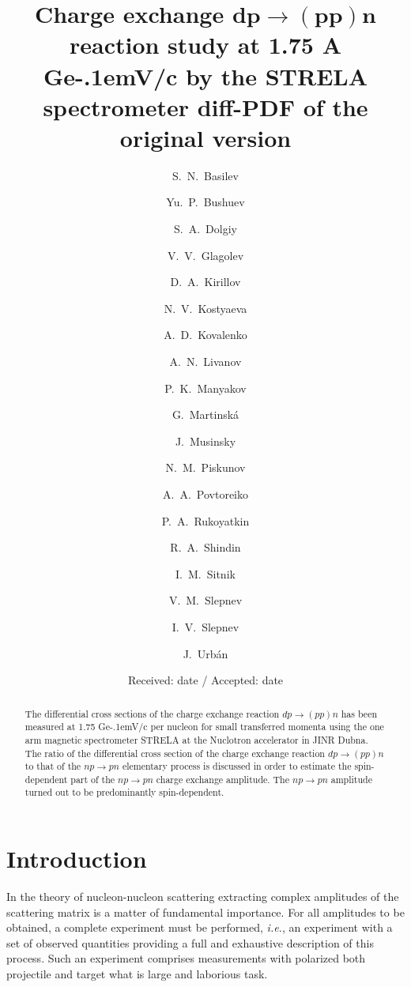 \documentclass[twocolumn,epjc3]{svjour3}
\newcommand{\np}     {\ensuremath{np \rightarrow pn}\xspace}
\newcommand{\dpchex} {\ensuremath{dp \rightarrow (pp)n}\xspace}
\newcommand{\GeVc}   {Ge\kern-.1emV/c\xspace}
\providecommand{\DIFaddtex}[1]{{\protect\color{Green} \sf #1}} %
\begin{document}
\title{Charge exchange
  $\boldsymbol{{\dpchex}}$ %
  reaction study at 1.75 A \GeVc by the STRELA spectrometer \DIFaddtex{diff-PDF of the original version}} %

\author{\raggedright
  S.~N.~Basilev    \and Yu.~P.~Bushuev   \and
  S.~A.~Dolgiy     \and V.~V.~Glagolev   \and
  D.~A.~Kirillov   \and N.~V.~Kostyaeva  \and
  A.~D.~Kovalenko  \and A.~N.~Livanov    \and
  P.~K.~Manyakov   \and G.~Martinsk\'{a} \and
  J.~Musinsky  \and N.~M.~Piskunov   \and
  A.~A.~Povtoreiko \and P.~A.~Rukoyatkin \and
  R.~A.~Shindin    \and I.~M.~Sitnik     \and
  V.~M.~Slepnev    \and I.~V.~Slepnev    \and
  J.~Urb\'{a}n
}


\date{Received: date / Accepted: date}
\maketitle

\begin{abstract}
  The differential cross sections of the charge exchange reaction \dpchex has
  been measured at 1.75 \GeVc per nucleon for small transferred momenta using
  the one arm magnetic spectrometer STRELA at the Nuclotron accelerator in JINR
  Dubna. The ratio of the differential cross section of the charge exchange
  reaction \dpchex to that of the \np elementary process is discussed in order
  to estimate the spin-dependent part of the \np charge exchange amplitude. The
  \np amplitude turned out to be predominantly spin-dependent.
\end{abstract}

\section{Introduction}
In the theory of nucleon-nucleon scattering extracting complex amplitudes of the
scattering matrix is a matter of fundamental importance. For all amplitudes to
be obtained, a complete experiment must be performed, \textit{i.e.}, an
experiment with a set of observed quantities providing a full and exhaustive
description of this process. Such an experiment comprises measurements with
polarized both projectile and target what is large and laborious task.
\end{document}
